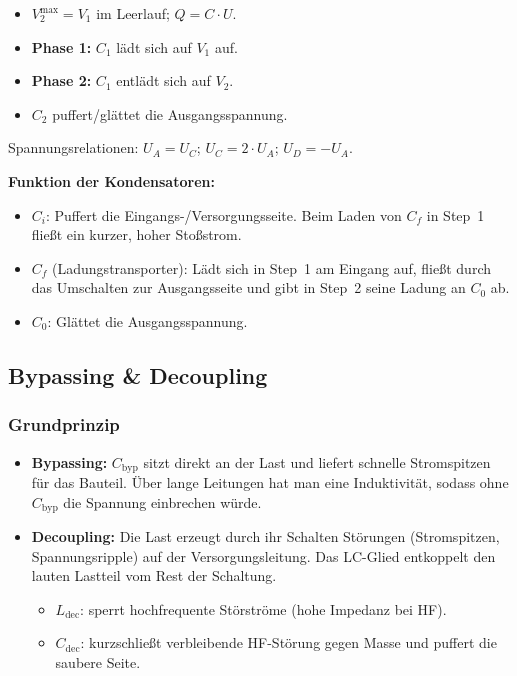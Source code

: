 \documentclass[11pt,a4paper]{article}
\begin{document}
\begin{itemize}
    \item $V_2^{\max} = V_1$ im Leerlauf; $Q = C \cdot U$.
    \item \textbf{Phase 1:} $C_1$ lädt sich auf $V_1$ auf.
    \item \textbf{Phase 2:} $C_1$ entlädt sich auf $V_2$.
    \item $C_2$ puffert/glättet die Ausgangsspannung.
\end{itemize}

Spannungsrelationen: $U_A = U_C$; $U_C = 2 \cdot U_A$; $U_D = -U_A$.

\textbf{Funktion der Kondensatoren:}
\begin{itemize}
    \item $C_i$: Puffert die Eingangs-/Versorgungsseite. Beim Laden von $C_f$ in Step~1 fließt ein kurzer, hoher Stoßstrom.
    \item $C_f$ (Ladungstransporter): Lädt sich in Step~1 am Eingang auf, fließt durch das Umschalten zur Ausgangsseite und gibt in Step~2 seine Ladung an $C_0$ ab.
    \item $C_0$: Glättet die Ausgangsspannung.
\end{itemize}

\subsection{Bypassing \& Decoupling}
\subsubsection{Grundprinzip}
\begin{itemize}
    \item \textbf{Bypassing:} $C_\mathrm{byp}$ sitzt direkt an der Last und liefert schnelle Stromspitzen für das Bauteil. Über lange Leitungen hat man eine Induktivität, sodass ohne $C_\mathrm{byp}$ die Spannung einbrechen würde.
    \item \textbf{Decoupling:} Die Last erzeugt durch ihr Schalten Störungen (Stromspitzen, Spannungsripple) auf der Versorgungsleitung. Das LC-Glied entkoppelt den lauten Lastteil vom Rest der Schaltung.
    \begin{itemize}
        \item $L_\mathrm{dec}$: sperrt hochfrequente Störströme (hohe Impedanz bei HF).
        \item $C_\mathrm{dec}$: kurzschließt verbleibende HF-Störung gegen Masse und puffert die saubere Seite.
    \end{itemize}
\end{itemize}
\end{document}
